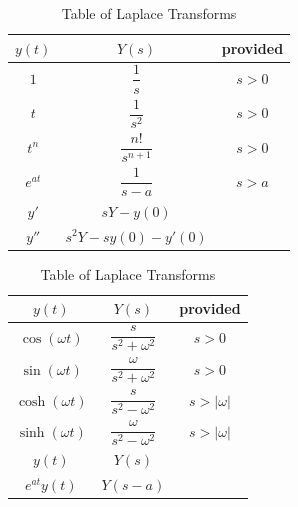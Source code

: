 \begin{table}
\begin{center}
\begin{tabular}[t]{|c|cc|}
\hline
$y(t)$ & $Y(s)$ & provided\\
\hline\hline
$1$					&$\dfrac{1}{s}$ 							&$s>0$\\\hline
$t$				&$\dfrac{1}{s^{2}}$ 			&$s>0$\\\hline
$t^n$				&$\dfrac{n!}{s^{n+1}}$ 			&$s>0$\\\hline
$e^{at}$		&$\dfrac{1}{s-a}$ 			&$s>a$\\\hline
$y'$					&$sY-y(0)$ 						&\\\hline
$y''$					&$s^2Y-sy(0)-y'(0)$ 						&\\\hline
\end{tabular}
\quad
\begin{tabular}[t]{|c|cc|}
\hline
$y(t)$ & $Y(s)$ & provided\\
\hline\hline
$\cos(\omega t)$  &$\dfrac{s}{s^2+\omega^2}$ 			&$s>0$\\\hline
$\sin(\omega t)$  &$\dfrac{\omega}{s^2+\omega^2}$ 			&$s>0$\\\hline
$\cosh(\omega t)$ &$\dfrac{s}{s^2-\omega^2}$ 			&$s>|\omega|$\\\hline
$\sinh(\omega t)$ &$\dfrac{\omega}{s^2-\omega^2}$ 			&$s>|\omega|$\\\hline
$y(t)$  &$Y(s)$ 						&\\\hline
$e^{at}y(t)$  &$Y(s-a)$ 						&\\\hline
\end{tabular}

\caption{Table of Laplace Transforms}
\label{laplacetable2}
\end{center}
\end{table}



